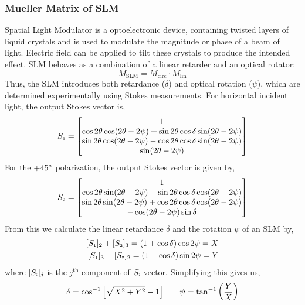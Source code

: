 \subsubsection{Mueller Matrix of SLM}
Spatial Light Modulator is a optoelectronic device, containing twisted layers of liquid crystals and is used to modulate the magnitude or phase of a beam of light. Electric field can be applied to tilt these crystals to produce the intended effect. SLM behaves as a combination of a linear retarder and an optical rotator:
\begin{equation}
M_{\text{SLM}} = M_{\text{circ}} \cdot M_{\text{lin}}
\end{equation}
Thus, the SLM introduces both retardance ($\delta$) and optical rotation ($\psi$), which are determined experimentally using Stokes measurements. For horizontal incident light, the output Stokes vector is, 
\begin{equation}
    S\tund{1} = \mqty[1 \\ \cos 2\theta \cos(2\theta-2\psi)+\sin 2\theta\cos\delta \sin(2\theta-2\psi)\\ \sin 2\theta \cos(2\theta-2\psi)-\cos 2\theta\cos\delta \sin(2\theta-2\psi)\\ \sin(2\theta-2\psi)]
\end{equation}
For the $+45\degree$ polarization, the output Stokes vector is given by, 
\begin{equation}
    S\tund{2} = \mqty[1 \\ \cos 2\theta \sin(2\theta-2\psi)-\sin 2\theta\cos\delta \cos(2\theta-2\psi)\\ \sin 2\theta \sin(2\theta-2\psi)+\cos 2\theta\cos\delta \cos(2\theta-2\psi)\\ -\cos(2\theta-2\psi)\sin \delta]
\end{equation}
From this we calculate the linear retardance $\delta$ and the rotation $\psi$ of an SLM by,
\begin{align}
   \begin{split}
     [S\tund{1}]_2+[S\tund{2}]_3 = (1+\cos \delta)\cos 2\psi=X\\
     [S\tund{1}]_3-[S\tund{2}]_2= (1+\cos \delta)\sin 2\psi=Y
   \end{split}
\end{align}
where $[S_{\text{\tiny i}}]_j $ is the $j^{\text{th}}$ component of $S_{\text{\tiny i}}$ vector. Simplifying this gives us, 
\begin{align}
    \delta = \cos^{-1}\qty[\sqrt{X^2+Y^2}-1] \qquad \psi = \tan^{-1}\qty(\frac{Y}{X})
\end{align}
